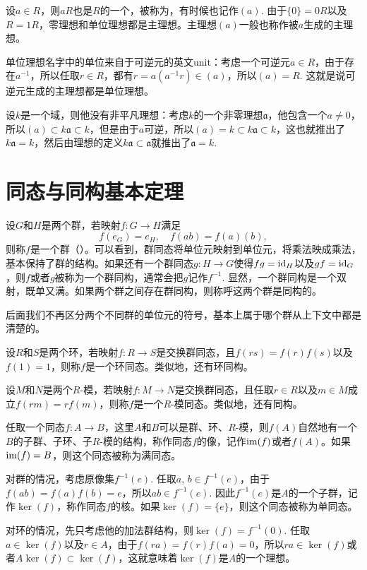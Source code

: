设$a\in R$，则$aR$也是$R$的一个，被称为，有时候也记作$(a)$. 由于$\{0\}=0R$以及$R=1R$，零理想和单位理想都是主理想。主理想$(a)$一般也称作被$a$生成的主理想。

单位理想名字中的单位来自于可逆元的英文unit：考虑一个可逆元$a\in R$，由于存在$a^{-1}$，所以任取$r\in R$，都有$r=a(a^{-1}r)\in (a)$，所以$(a)=R$. 这就是说可逆元生成的主理想都是单位理想。

设$k$是一个域，则他没有非平凡理想：考虑$k$的一个非零理想$\mathfrak{a}$，他包含一个$a\neq 0$，所以$(a)\subset k\mathfrak{a} \subset k$，但是由于$a$可逆，所以$(a)=k\subset k\mathfrak{a} \subset k$，这也就推出了$k\mathfrak{a}=k$，然后由理想的定义$k\mathfrak{a}\subset \mathfrak{a}$就推出了$\mathfrak{a}=k$.

\section{同态与同构基本定理}

\para 设$G$和$H$是两个群，若映射$f:G\to H$满足
\[
	f(e_G)=e_H,\quad f(ab)=f(a)(b),
\]
则称$f$是一个群（）。可以看到，群同态将单位元映射到单位元，将乘法映成乘法，基本保持了群的结构。如果还有一个群同态$g:H\to G$使得$fg=\operatorname{id}_H$以及$gf=\operatorname{id}_G$，则$f$或者$g$被称为一个群同构，通常会把$g$记作$f^{-1}$. 显然，一个群同构是一个双射，既单又满。如果两个群之间存在群同构，则称呼这两个群是同构的。

后面我们不再区分两个不同群的单位元的符号，基本上属于哪个群从上下文中都是清楚的。

\para 设$R$和$S$是两个环，若映射$f:R\to S$是交换群同态，且$f(rs)=f(r)f(s)$以及$f(1)=1$，则称$f$是一个环同态。类似地，还有环同构。

设$M$和$N$是两个$R$-模，若映射$f:M\to N$是交换群同态，且任取$r\in R$以及$m\in M$成立$f(rm)=rf(m)$，则称$f$是一个$R$-模同态。类似地，还有同构。

\para 任取一个同态$f:A\to B$，这里$A$和$B$可以是群、环、$R$-模，则$f(A)$自然地有一个$B$的子群、子环、子$R$-模的结构，称作同态$f$的像，记作$\operatorname{im}(f)$或者$f(A)$。如果$\operatorname{im}(f)=B$，则这个同态被称为满同态。

对群的情况，考虑原像集$f^{-1}(e)$. 任取$a$, $b\in f^{-1}(e)$，由于$f(ab)=f(a)f(b)=e$，所以$ab\in f^{-1}(e)$. 因此$f^{-1}(e)$是$A$的一个子群，记作$\ker(f)$，称作同态$f$的核。如果$\ker(f)=\{e\}$，则这个同态被称为单同态。

对环的情况，先只考虑他的加法群结构，则$\ker(f)=f^{-1}(0)$. 任取$a\in \ker(f)$以及$r\in A$，由于$f(ra)=f(r)f(a)=0$，所以$ra\in \ker(f)$或者$A\ker(f)\subset \ker(f)$，这就意味着$\ker(f)$是$A$的一个理想。

